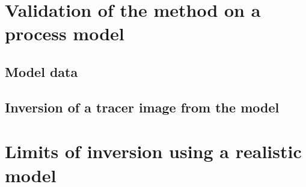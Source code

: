 \documentclass[compress,slidescentered,notes=show]{beamer}
\begin{document}
\begin{frame}
\end{frame}

\section[Process model data]{Validation of the method on a process model}


	\subsection{Model data}
\begin{frame}
\end{frame}

	\subsection{Inversion of a tracer image from the model}
\begin{frame}
\end{frame} 


\section[Realistic Model data]{Limits of inversion using a realistic model}
\end{document}
